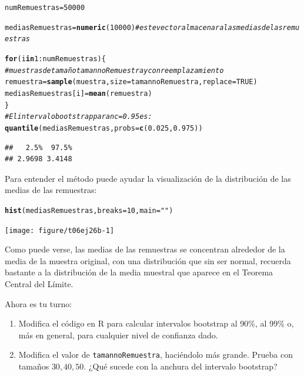 \documentclass[10pt,a4paper]{article}\usepackage[]{graphicx}\usepackage[]{color}
\makeatletter
\newcommand{\hlnum}[1]{\textcolor[rgb]{0.686,0.059,0.569}{#1}}%
\newcommand{\hlstr}[1]{\textcolor[rgb]{0.192,0.494,0.8}{#1}}%
\newcommand{\hlcom}[1]{\textcolor[rgb]{0.678,0.584,0.686}{\textit{#1}}}%
\newcommand{\hlopt}[1]{\textcolor[rgb]{0,0,0}{#1}}%
\newcommand{\hlstd}[1]{\textcolor[rgb]{0.345,0.345,0.345}{#1}}%
\newcommand{\hlkwa}[1]{\textcolor[rgb]{0.161,0.373,0.58}{\textbf{#1}}}%
\newcommand{\hlkwb}[1]{\textcolor[rgb]{0.69,0.353,0.396}{#1}}%
\newcommand{\hlkwc}[1]{\textcolor[rgb]{0.333,0.667,0.333}{#1}}%
\newcommand{\hlkwd}[1]{\textcolor[rgb]{0.737,0.353,0.396}{\textbf{#1}}}%
\newenvironment{kframe}{%
 \def\at@end@of@kframe{}%
 \ifinner\ifhmode%
  \def\at@end@of@kframe{\end{minipage}}%
  \begin{minipage}{\columnwidth}%
 \fi\fi%
 \def\FrameCommand##1{\hskip\@totalleftmargin \hskip-\fboxsep
 \colorbox{shadecolor}{##1}\hskip-\fboxsep
     \hskip-\linewidth \hskip-\@totalleftmargin \hskip\columnwidth}%
 \MakeFramed {\advance\hsize-\width
   \@totalleftmargin\z@ \linewidth\hsize
   \@setminipage}}%
 {\par\unskip\endMakeFramed%
 \at@end@of@kframe}
\newenvironment{knitrout}{}{} %
\makeatother
\begin{document}
\begin{ejercicio}
\begin{knitrout}
\begin{kframe}
\begin{alltt}
\hlstd{numRemuestras} \hlkwb{=} \hlnum{50000}

\hlstd{mediasRemuestras} \hlkwb{=} \hlkwd{numeric}\hlstd{(}\hlnum{10000}\hlstd{)} \hlcom{# este vector almacenara las medias de las remuestras}

\hlkwa{for}\hlstd{(i} \hlkwa{in} \hlnum{1}\hlopt{:}\hlstd{numRemuestras)\{}
  \hlcom{# muestras de tamaño tamannoRemuestra y con reemplazamiento}
  \hlstd{remuestra} \hlkwb{=} \hlkwd{sample}\hlstd{(muestra,} \hlkwc{size} \hlstd{= tamannoRemuestra,} \hlkwc{replace} \hlstd{=} \hlnum{TRUE}\hlstd{)}
  \hlstd{mediasRemuestras[i]} \hlkwb{=} \hlkwd{mean}\hlstd{(remuestra)}
\hlstd{\}}
\hlcom{# El intervalo bootstrap para nc=0.95 es:}
\hlkwd{quantile}\hlstd{(mediasRemuestras,} \hlkwc{probs} \hlstd{=} \hlkwd{c}\hlstd{(}\hlnum{0.025}\hlstd{,} \hlnum{0.975}\hlstd{))}
\end{alltt}
\begin{verbatim}
##   2.5%  97.5% 
## 2.9698 3.4148
\end{verbatim}
\end{kframe}
\end{knitrout}

Para entender el método puede ayudar la visualización de la distribución de las medias de las remuestras:
\begin{knitrout}
\color{fgcolor}\begin{kframe}
\begin{alltt}
\hlkwd{hist}\hlstd{(mediasRemuestras,} \hlkwc{breaks} \hlstd{=} \hlnum{10}\hlstd{,} \hlkwc{main}\hlstd{=}\hlstr{""}\hlstd{)}
\end{alltt}
\end{kframe}
\texttt{[image: figure/t06ej26b-1]} 

\end{knitrout}
Como puede verse, las medias de las remuestras se concentran alrededor de la media de la muestra original, con una distribución que sin ser normal, recuerda bastante a la distribución de la media muestral que aparece en el Teorema Central del Límite.

Ahora es tu turno:
\begin{enumerate}
  \item Modifica el código en R para calcular intervalos bootstrap al 90\%, al 99\% o, más en general, para cualquier nivel de confianza dado.
  \item Modifica el valor de {\tt tamannoRemuestra}, haciéndolo más grande. Prueba con tamaños $30, 40, 50$. ¿Qué sucede con la anchura del intervalo bootstrap?


\end{enumerate}
\end{ejercicio}
\end{document}
